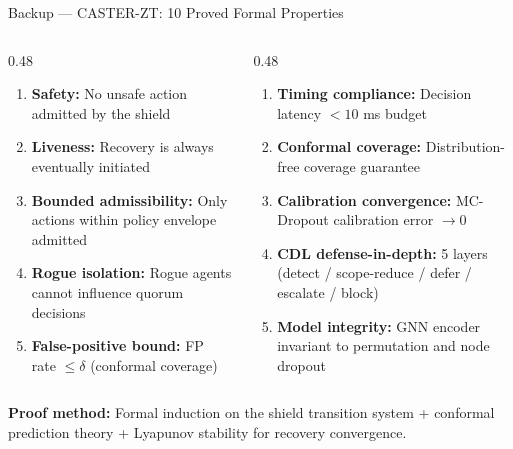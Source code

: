 \documentclass[aspectratio=169, 11pt]{beamer}
\begin{document}
\begin{frame}[label=backup-caster]{Backup — CASTER-ZT: 10 Proved Formal Properties}

\begin{columns}[T]
\begin{column}{0.48\textwidth}
  \begin{enumerate}\setlength{\itemsep}{2pt}
    \item \textbf{Safety:} No unsafe action admitted by the shield
    \item \textbf{Liveness:} Recovery is always eventually initiated
    \item \textbf{Bounded admissibility:} Only actions within policy envelope admitted
    \item \textbf{Rogue isolation:} Rogue agents cannot influence quorum decisions
    \item \textbf{False-positive bound:} FP rate $\leq \delta$ (conformal coverage)
  \end{enumerate}
\end{column}
\begin{column}{0.48\textwidth}
  \begin{enumerate}\setlength{\itemsep}{2pt}
    \setcounter{enumi}{5}
    \item \textbf{Timing compliance:} Decision latency $< 10$ ms budget
    \item \textbf{Conformal coverage:} Distribution-free coverage guarantee
    \item \textbf{Calibration convergence:} MC-Dropout calibration error $\to 0$
    \item \textbf{CDL defense-in-depth:} 5 layers (detect / scope-reduce / defer / escalate / block)
    \item \textbf{Model integrity:} GNN encoder invariant to permutation and node dropout
  \end{enumerate}
\end{column}
\end{columns}

\vspace{4pt}
\textbf{Proof method:} Formal induction on the shield transition system + conformal prediction theory + Lyapunov stability for recovery convergence.

\end{frame}
\end{document}
